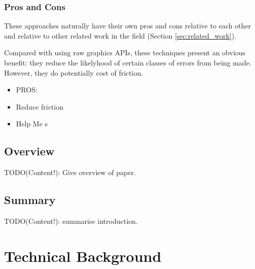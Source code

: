 \documentclass[a4paper,12pt,twoside,openright]{report}
\begin{document}
\subsection{Pros and Cons}

These approaches naturally have their own pros and cons relative to each other
and relative to other related work in the field (Section
\ref{sec:related_work}).

Compared with using raw graphics APIs, these techniques present an obvious
benefit: they reduce the likelyhood of certain classes of errors from being
made. However, they do potentially cost of friction.

\begin{itemize}

    \item PROS:

        \item Reduce friction

        \item Help Me s

\end{itemize}

\section{Overview}




TODO(Content!): Give overview of paper.

\section{Summary}

TODO(Content!): summarise introduction.

\chapter{Technical Background}
\end{document}

